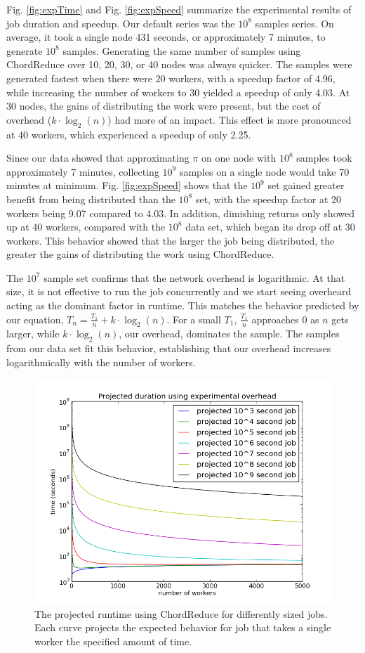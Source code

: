Fig. \ref{fig:expTime} and Fig. \ref{fig:expSpeed} summarize the experimental results of job duration and speedup.  
Our default series was the $10^{8}$ samples series.  
On average, it took a single node 431 seconds, or approximately 7 minutes, to generate $10^{8}$ samples.  
Generating the same number of samples using ChordReduce over 10, 20, 30, or 40 nodes was always quicker.  
The samples were generated fastest when there were 20 workers, with a speedup factor of 4.96, while increasing the number of workers to 30 yielded a speedup of only 4.03.  
At 30 nodes, the gains of distributing the work were present, but the cost of overhead ($k \cdot \log_{2}(n)$) had more of an impact.  
This effect is more pronounced at 40 workers, which experienced  a speedup of only 2.25.

Since our data showed that approximating $\pi$ on one node with $10^{8}$ samples took approximately 7 minutes, collecting $10^{9}$ samples on a single node would take 70 minutes at minimum.  
Fig. \ref{fig:expSpeed} shows that the $10^{9}$ set gained greater benefit from being distributed than the $10^{8}$ set, with the speedup factor at 20 workers being 9.07 compared to 4.03.  
In addition, dimishing returns only showed up at 40 workers, compared with the $10^{8}$ data set, which began its drop off at 30 workers.
This behavior showed that the larger the job being distributed, the greater the gains of distributing the work using ChordReduce.

The $10^{7}$ sample set confirms that the network overhead is logarithmic.  
At that size, it is not effective to run the job concurrently and we start seeing overheard acting as the dominant factor in runtime.  
This matches the behavior predicted by our equation, $T_{n} = \frac{T_{1}}{n} + k \cdot \log_{2}(n)$. 
For a small $T_{1}$, $\frac{T_{1}}{n}$  approaches 0 as $n$ gets larger, while $k \cdot \log_{2}(n)$, our overhead, dominates the sample.  
The samples from our data set fit this behavior, establishing that our overhead increases logarithmically with the number of workers.


\begin{figure}
	\centering
	\includegraphics[width=0.5\linewidth]{figs/projTime}
	\caption{The projected runtime using ChordReduce for differently sized jobs.  Each curve projects the expected behavior for job that takes a single worker the specified amount of time.}
	\label{fig:projTime}
\end{figure}

